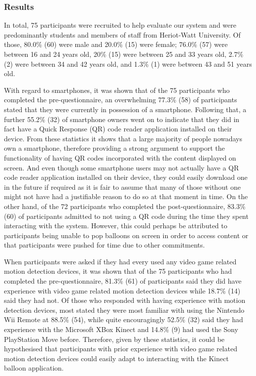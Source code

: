 \subsubsection{Results}

In total, 75 participants were recruited to help evaluate our system and were predominantly students and members of staff from Heriot-Watt University. Of those, 80.0\% (60) were male and 20.0\% (15) were female; 76.0\% (57) were between 16 and 24 years old, 20\% (15) were between 25 and 33 years old, 2.7\% (2) were between 34 and 42 years old, and 1.3\% (1) were between 43 and 51 years old.

With regard to smartphones, it was shown that of the 75 participants who completed the pre-questionnaire, an overwhelming 77.3\% (58) of participants stated that they were currently in possession of a smartphone. Following that, a further 55.2\% (32) of smartphone owners went on to indicate that they did in fact have a Quick Response (QR) code reader application installed on their device. From these statistics it shows that a large majority of people nowadays own a smartphone, therefore providing a strong argument to support the functionality of having QR codes incorporated with the content displayed on screen. And even though some smartphone users may not actually have a QR code reader application installed on their device, they could easily download one in the future if required as it is fair to assume that many of those without one might not have had a justifiable reason to do so at that moment in time.
On the other hand, of the 72 participants who completed the post-questionnaire, 83.3\% (60) of participants admitted to not using a QR code during the time they spent interacting with the system. However, this could perhaps be attributed to participants being unable to pop balloons on screen in order to access content or that participants were pushed for time due to other commitments.

When participants were asked if they had every used any video game related motion detection devices, it was shown that of the 75 participants who had completed the pre-questionnaire, 81.3\% (61) of participants said they did have experience with video game related motion detection devices while 18.7\% (14) said they had not. Of those who responded with having experience with motion detection devices, most stated they were most familiar with using the Nintendo Wii Remote at 88.5\% (54), while quite encouragingly 52.5\% (32) said they had experience with the Microsoft XBox Kinect and 14.8\% (9) had used the Sony PlayStation Move before. Therefore, given by these statistics, it could be hypothesised that participants with prior experience with video game related motion detection devices could easily adapt to interacting with the Kinect balloon application.

